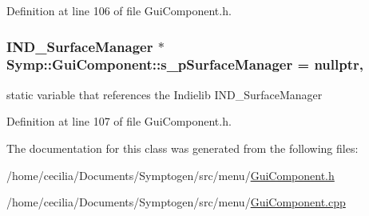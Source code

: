 Definition at line 106 of file Gui\-Component.\-h.

\hypertarget{class_symp_1_1_gui_component_a768d28ae7ffce1d8a8025e6204f82ee5}{
\subsubsection[{s\-\_\-p\-Surface\-Manager}]{\setlength{\rightskip}{0pt plus 5cm}I\-N\-D\-\_\-\-Surface\-Manager $\ast$ Symp\-::\-Gui\-Component\-::s\-\_\-p\-Surface\-Manager = nullptr\hspace{0.3cm}{\ttfamily [static]}, {\ttfamily [protected]}}}\label{class_symp_1_1_gui_component_a768d28ae7ffce1d8a8025e6204f82ee5}
static variable that references the Indielib I\-N\-D\-\_\-\-Surface\-Manager 

Definition at line 107 of file Gui\-Component.\-h.



The documentation for this class was generated from the following files\-:\begin{DoxyCompactItemize}
\item 
/home/cecilia/\-Documents/\-Symptogen/src/menu/\hyperlink{_gui_component_8h}{Gui\-Component.\-h}\item 
/home/cecilia/\-Documents/\-Symptogen/src/menu/\hyperlink{_gui_component_8cpp}{Gui\-Component.\-cpp}\end{DoxyCompactItemize}
